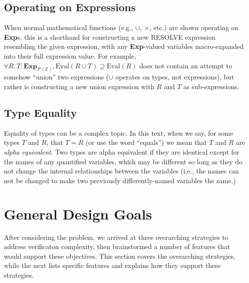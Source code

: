 	\subsection{Operating on Expressions\label{operatingOnExpressions}}

When normal mathematical functions (e.g., $\cup$, $\times$, etc.) are shown operating on \textbf{Exp}s, this is a shorthand for constructing a new RESOLVE expression resembling the given expression, with any \textbf{Exp}-valued variables macro-expanded into their full expression value.  For example, $\forall R, T : \textbf{Exp}_{\mathcal{P}(\mathbb{Z})}, \text{Eval}(R \cup T) \supseteq \text{Eval}(R)$ does not contain an attempt to somehow ``union'' two expressions ($\cup$ operates on types, not expressions), but rather is constructing a new union expression with $R$ and $T$ as sub-expressions.

	\subsection{Type Equality\label{typeEquality}}

Equality of types can be a complex topic.  In this text, when we say, for some types $T$ and $R$, that $T = R$ (or use the word ``equals'') we mean that $T$ and $R$ are \emph{alpha equivalent}.  Two types are alpha equivalent if they are identical except for the names of any quantified variables, which may be different so long as they do not change the internal relationships between the variables (i.e., the names can not be changed to make two previously differently-named variables the same.)

\section{General Design Goals\label{mathDesignGoals}}

After considering the problem, we arrived at three overarching strategies to address verificaton complexity, then brainstormed a number of features that would support these objectives.  This section covers the overarching strategies, while the next lists specific features and explains how they support these strategies. 

